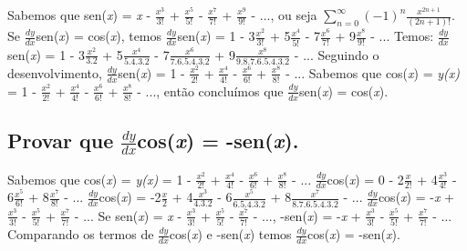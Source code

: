 Sabemos que sen(\textit{x}) = \textit{x} - $\frac{x^3}{3!}$ + $\frac{x^5}{5!}$ - $\frac{x^7}{7!}$ + $\frac{x^9}{9!}$ - ..., ou seja $\sum_{n=0}^{\infty}$$(-1)^{n}$$\frac{x^{2n + 1}}{(2n + 1)!}$.
\newline
Se $\frac{dy}{dx}$sen(\textit{x}) = cos(\textit{x}), temos $\frac{dy}{dx}$sen(\textit{x}) = 1 - 3$\frac{x^2}{3!}$ + 5$\frac{x^4}{5!}$ - 7$\frac{x^6}{7!}$ + 9$\frac{x^8}{9!}$ - ... 
\newline
Temos: $\frac{dy}{dx}$sen(\textit{x}) = 1 - 3$\frac{x^2}{3.2}$ + 5$\frac{x^4}{5.4.3.2}$ - 7$\frac{x^6}{7.6.5.4.3.2}$ + 9$\frac{x^8}{9.8.7.6.5.4.3.2}$ - ...
\newline
Seguindo o desenvolvimento, $\frac{dy}{dx}$sen(\textit{x}) = 1 - $\frac{x^2}{2!}$ + $\frac{x^4}{4!}$ - $\frac{x^6}{6!}$ + $\frac{x^8}{8!}$ - ...
\newline
Sabemos que cos(\textit{x}) = \textit{y(x)} = 1 - $\frac{x^2}{2!}$ + $\frac{x^4}{4!}$ - $\frac{x^6}{6!}$ + $\frac{x^8}{8!}$ - ..., então concluímos que  $\frac{dy}{dx}$sen(\textit{x}) = cos(\textit{x}).

\subsection{Provar que $\frac{dy}{dx}$cos(\textit{x}) = -sen(\textit{x}).}
Sabemos que cos(\textit{x}) = \textit{y(x)} = 1 - $\frac{x^2}{2!}$ + $\frac{x^4}{4!}$ - $\frac{x^6}{6!}$ + $\frac{x^8}{8!}$ - ...
\newline
$\frac{dy}{dx}$cos(\textit{x}) = 0 - 2$\frac{x}{2!}$ + 4$\frac{x^3}{4!}$ - 6$\frac{x^5}{6!}$ + 8$\frac{x^7}{8!}$ - ... 
\newline
$\frac{dy}{dx}$cos(\textit{x}) = -2$\frac{x}{2}$ + 4$\frac{x^3}{4.3.2}$ - 6$\frac{x^5}{6.5.4.3.2}$ + 8$\frac{x^7}{8.7.6.5.4.3.2}$ - ... 
\newline
$\frac{dy}{dx}$cos(\textit{x}) = -\textit{x} + $\frac{x^3}{3!}$ - $\frac{x^5}{5!}$ + $\frac{x^7}{7!}$ - ... 
\newline
Se sen(\textit{x}) = \textit{x} - $\frac{x^3}{3!}$ + $\frac{x^5}{5!}$ - $\frac{x^7}{7!}$ - ..., -sen(\textit{x}) = -\textit{x} + $\frac{x^3}{3!}$ - $\frac{x^5}{5!}$ + $\frac{x^7}{7!}$ - ...
\newline
Comparando os termos de $\frac{dy}{dx}$cos(\textit{x}) e -sen(\textit{x}) temos $\frac{dy}{dx}$cos(\textit{x}) = -sen(\textit{x}).


